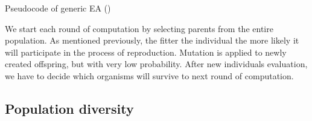 % 
% 
% 


\begin{algorithm}
 
  \BlankLine
  \initialise{\population} \;
  

  \caption{Pseudocode of generic EA (\cite{evo})}\label{pseudo_EA}  
\end{algorithm}

We start each round of computation by selecting parents from the entire population.
As mentioned previously, the fitter the individual the more likely it will participate in the process of reproduction.
Mutation is applied to newly created offspring, but with very low probability.
After new individuals evaluation, we have to decide which organisms will survive to next round of computation. 


\subsection{Population diversity}
\label{sec:population_diversity}

